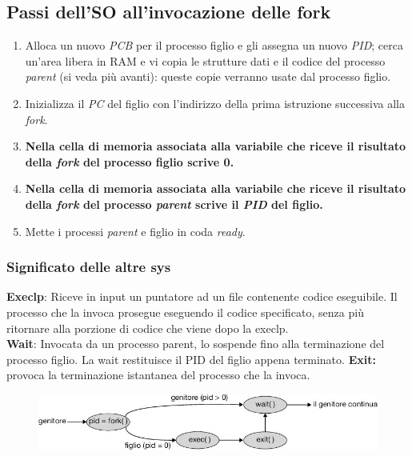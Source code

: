 \subsection{Passi dell'SO all'invocazione delle fork}
\begin{enumerate}
    \item Alloca un nuovo \textit{PCB} per il processo figlio e gli assegna un nuovo \textit{PID}; cerca un’area libera in RAM e vi copia le strutture dati e il codice del processo \textit{parent} (si veda più avanti): queste copie verranno usate dal processo figlio.
    \item Inizializza il \textit{PC} del figlio con l’indirizzo della prima istruzione successiva alla \textit{fork}.
    \item \textbf{Nella cella di memoria associata alla variabile che riceve il risultato della \textit{fork} del processo figlio scrive 0.}
    \item \textbf{Nella cella di memoria associata alla variabile che riceve il risultato della \textit{fork} del processo \textit{parent} scrive il \textit{PID} del figlio.}
    \item Mette i processi \textit{parent} e figlio in coda \textit{ready}.
\end{enumerate}


\subsubsection{Significato delle altre sys}
\textbf{Execlp}: Riceve in input un puntatore ad un file contenente codice eseguibile. Il processo che la invoca prosegue eseguendo il codice specificato, senza più ritornare alla porzione di codice che viene dopo la execlp.\\
\textbf{Wait}: Invocata da un processo parent, lo sospende fino alla terminazione del processo figlio. La wait restituisce il PID del figlio appena terminato.
\textbf{Exit:} provoca la terminazione istantanea del processo che la invoca.\\

\begin{figure}[h]
    \centering
    \includegraphics[width=0.5\linewidth]{images/child&parentLoveandFriend.png}
\end{figure}

